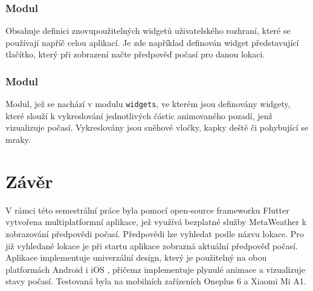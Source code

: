 \documentclass[12pt, a4paper]{article}
\let\oldsection\section
\renewcommand\section{\clearpage\oldsection}
\begin{document}
\subsubsection{Modul }
Obsahuje definici znovupoužitelných widgetů uživatelského rozhraní, které se používají napříč celou aplikací. Je zde například definován widget představující tlačítko, který při zobrazení načte předpověď počasí pro danou lokaci.

\subsubsection{Modul }
Modul, jež se nachází v modulu \texttt{widgets}, ve kterém jsou definovány widgety, které slouží k vykreslování jednotlivých částic animovaného pozadí, jenž vizualizuje počasí. Vykreslovány jsou sněhové vločky, kapky deště či pohybující se mraky.

\section{Závěr}
    V rámci této semestrální práce byla pomocí open-source frameworku Flutter vytvořena multiplatformní aplikace, jež využívá bezplatné služby MetaWeather k zobrazování předpovědi počasí. Předpovědi lze vyhledat podle názvu lokace. Pro již vyhledané lokace je při startu aplikace zobrazná aktuální předpověď počasí. Aplikace implementuje univerzální design, který je použitelný na obou platformách Android i iOS , přičemz implementuje plynulé animace a vizualizuje stavy počasí. Testovaná byla na mobilních zařízeních Oneplus 6 a Xiaomi Mi A1.



	
	
\end{document}
